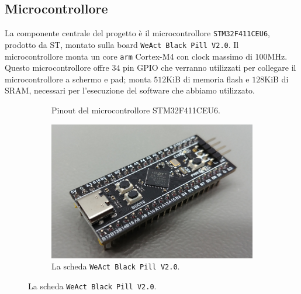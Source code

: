 \documentclass[hidelinks,12pt]{article}
\begin{document}
\subsection{Microcontrollore}
La componente centrale del progetto è il microcontrollore
\texttt{STM32F411CEU6}, prodotto da ST, montato sulla board \texttt{WeAct Black
	Pill V2.0}. Il microcontrollore monta un core \texttt{arm} Cortex-M4 con clock
massimo di $100$MHz. Questo microcontrollore offre $34$ pin GPIO che verranno
utilizzati per collegare il microcontrollore a schermo e pad; monta $512$KiB di
memoria flash e $128$KiB di SRAM, necessari per l'esecuzione del software
che abbiamo utilizzato.
\begin{figure}
	\begin{subfigure}[b]{0.45\textwidth}
		\begin{center}
			\begin{tikzpicture}[x=0.015cm, y=0.015cm, scale=0.5, transform shape]
				
			\end{tikzpicture}
		\end{center}
		\caption{Pinout del microcontrollore STM32F411CEU6.}
		\label{fig:pinout_stm32}
	\end{subfigure}
	\hfill
	\begin{subfigure}[b]{0.45\textwidth}
		\begin{center}
			\includegraphics[scale=0.5]{figures/stm32.jpg}
		\end{center}
		\caption{La scheda \texttt{WeAct Black Pill V2.0}.}
		\label{fig:weact_blackpill}
	\end{subfigure}
\end{figure}
\end{document}
